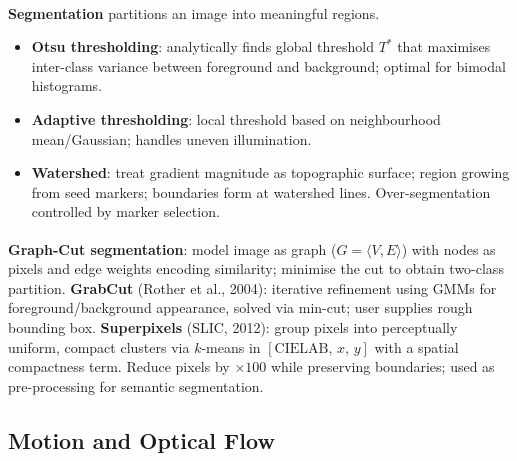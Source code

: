 \begin{tcbitemize}[ skin=sectionraster ]
    \tcbitem[title={Thresholding and Region-Based Segmentation}, raster multicolumn=3]
    \textbf{Segmentation} partitions an image into meaningful regions\textsuperscript{\cite[][pp.~741--804]{gonzalezWoods2018}}.
    \begin{itemize}
        \item \textbf{Otsu thresholding}: analytically finds global threshold $T^*$ that maximises inter-class variance between foreground and background; optimal for bimodal histograms.
        \item \textbf{Adaptive thresholding}: local threshold based on neighbourhood mean/Gaussian; handles uneven illumination.
        \item \textbf{Watershed}: treat gradient magnitude as topographic surface; region growing from seed markers; boundaries form at watershed lines. Over-segmentation controlled by marker selection.
    \end{itemize}

    \tcbitem[title={Graph-Cut and Superpixels}, raster multicolumn=3]
    \textbf{Graph-Cut segmentation}\textsuperscript{\cite[][pp.~302--306]{szeliski2022}}: model image as graph ($G = \langle V, E \rangle$) with nodes as pixels and edge weights encoding similarity; minimise the cut to obtain two-class partition.
    \textbf{GrabCut} (Rother et al., 2004): iterative refinement using GMMs for foreground/background appearance, solved via min-cut; user supplies rough bounding box.
    \tcblower
    \textbf{Superpixels} (SLIC, 2012): group pixels into perceptually uniform, compact clusters via $k$-means in $[\mathrm{CIELAB},\,x,\,y]$ with a spatial compactness term.
    Reduce pixels by ${\times}100$ while preserving boundaries; used as pre-processing for semantic segmentation.
\end{tcbitemize}

\subsection{Motion and Optical Flow}

